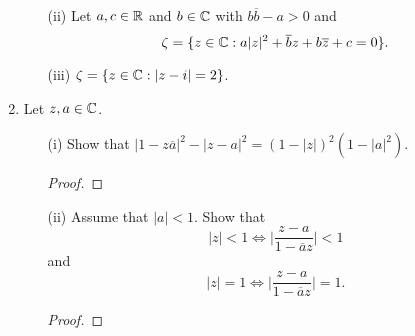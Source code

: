 \documentclass[a4paper]{article}
\begin{document}
\begin{enumerate}
\begin{enumerate}
\begin{solution}
                \end{solution}
            \item[(ii)] Let \( a,c \in \mathbb{R}  \) and \( b \in \mathbb{C}  \) with \( b \overline{b } - a > 0   \) and
                \[  \zeta = \{ z \in \mathbb{C} : a | z  |^{2} + \overline{b}z + b \overline{z} + c = 0    \}. \]
                \begin{solution}
                
                \end{solution}
            \item[(iii)] \( \zeta  = \{ z \in \mathbb{C} : | z - i  |  = 2  \}  \).
                \begin{solution}
                    
                \end{solution}
        \end{enumerate}
    \item Let \( z,a \in \mathbb{C}  \). 
        \begin{enumerate}
            \item[(i)] Show that \( |  1 - z \overline{a} |^{2} - | z - a  |^{2} = (1 - | z | )^{2} (1 - | a |^{2}) \).
                \begin{proof}
                
                \end{proof}
            \item[(ii)] Assume that \( | a  |  < 1  \). Show that 
                \[  | z  |  < 1 \iff \Big| \frac{ z - a  }{ 1 - \overline{a} z  } \Big| < 1     \]
                and
                \[  | z  |  = 1 \iff \Big| \frac{ z - a  }{  1 - \overline{a} z  }  \Big|  = 1. \]
                \begin{proof}
                
                \end{proof}
        \end{enumerate}

\end{enumerate}
\end{document}
